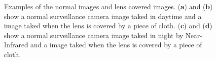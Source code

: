 \documentclass[sensors,article,submit,moreauthors,pdftex,10pt,a4paper]{mdpi}
\begin{document}
\begin{figure}[H]
\centering
{}
\caption{Examples of the normal images and lens covered images. (\textbf{a}) and (\textbf{b}) show a normal surveillance camera image taked in daytime and a image taked when the lens is covered by a piece of cloth. (\textbf{c}) and (\textbf{d}) show a normal surveillance camera image taked in night by Near-Infrared and a image taked when the lens is covered by a piece of cloth.}
\label{shelter}
\end{figure} 
\end{document}
